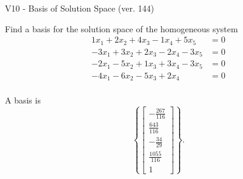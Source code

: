 \begin{exercise}
  \begin{exerciseTitle}V10 - Basis of Solution Space (ver. 144)\end{exerciseTitle}
  \begin{exerciseStatement}
    Find a basis for the solution space of the homogeneous system 
\begin{align*}
 1 x_ 1 + 2 x_ 2 + 4 x_ 3 -1 x_ 4 + 5 x_ 5 &= 0  \\ 
  -3 x_ 1 + 3 x_ 2 + 2 x_ 3 -2 x_ 4 -3 x_ 5 &= 0  \\ 
  -2 x_ 1 -5 x_ 2 + 1 x_ 3 + 3 x_ 4 -3 x_ 5 &= 0  \\ 
  -4 x_ 1 -6 x_ 2 -5 x_ 3 + 2 x_ 4 &= 0  \\ 
 \end{align*}


 
  \end{exerciseStatement}

  \begin{exerciseAnswer}
   A basis is   
\[\left\{\left[\begin{array}{c}
-\frac{267}{116} \\
\frac{643}{116} \\
-\frac{34}{29} \\
\frac{1055}{116} \\
1
\end{array}\right]\right\}.\]

  


  \end{exerciseAnswer}
\end{exercise}